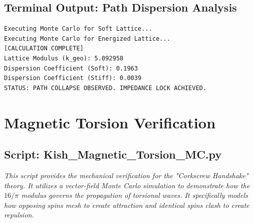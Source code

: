 \documentclass[11pt, letterpaper, openany]{book}
\begin{document}
\section{Terminal Output: Path Dispersion Analysis}
\begin{lstlisting}[style=terminal]
Executing Monte Carlo for Soft Lattice...
Executing Monte Carlo for Energized Lattice...
[CALCULATION COMPLETE]
Lattice Modulus (k_geo): 5.092958
Dispersion Coefficient (Soft): 0.1963
Dispersion Coefficient (Stiff): 0.0039
STATUS: PATH COLLAPSE OBSERVED. IMPEDANCE LOCK ACHIEVED.
\end{lstlisting}

\chapter{Magnetic Torsion Verification}
\label{app:magnetic_sim}

\section{Script: Kish\_Magnetic\_Torsion\_MC.py}
\textit{This script provides the mechanical verification for the "Corkscrew Handshake" theory. It utilizes a vector-field Monte Carlo simulation to demonstrate how the $16/\pi$ modulus governs the propagation of torsional waves. It specifically models how opposing spins mesh to create attraction and identical spins clash to create repulsion.}
\end{document}
